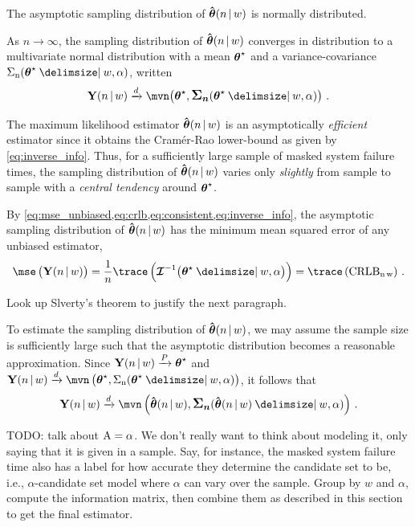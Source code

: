 \documentclass[
    11pt,
    extrafontsizes,
    article,
    oldfontcommands,
    final,
    oneside,
    openany,
    hidelinks]{memoir}
\begin{document}
The asymptotic sampling distribution of $\boldsymbol{\mathbf{\hat{\boldsymbol{\mathbf{\theta}}}}}(n {\,|\,} w)$ is normally distributed.
\begin{postulate}
\label{def:converge_in_dist}
    As $n \to \infty$, the sampling distribution of $\boldsymbol{\mathbf{\hat{\boldsymbol{\mathbf{\theta}}}}}(n {\,|\,} w)$ converges in distribution to a multivariate normal distribution with a mean ${\boldsymbol{\mathbf{\theta}}}^{\star}$ and a variance-covariance $\cov(\tparam\sysparamvec \Given w, \alpha)$, written
    \begin{equation}
    \label{eq:converge_in_dist}
        \sampd \xrightarrow{d} \mvn\!
            \left(
                \tparam\sysparamvec, \cov(\tparam\sysparamvec \Given w, \alpha)
            \right)\,.
    \end{equation}
\end{postulate}
The maximum likelihood estimator $\boldsymbol{\mathbf{\hat{\boldsymbol{\mathbf{\theta}}}}}(n {\,|\,} w)$ is an asymptotically \emph{efficient} estimator since it obtains the Cram\'{e}r-Rao lower-bound as given by \cref{eq:inverse_info}. Thus, for a sufficiently large sample of masked system failure times, the sampling distribution of $\boldsymbol{\mathbf{\hat{\boldsymbol{\mathbf{\theta}}}}}(n {\,|\,} w)$ varies only \emph{slightly} from sample to sample with a \emph{central tendency} around ${\boldsymbol{\mathbf{\theta}}}^{\star}$. 

By \cref{eq:mse_unbiased,eq:crlb,eq:consistent,eq:inverse_info}, the asymptotic sampling distribution of $\boldsymbol{\mathbf{\hat{\boldsymbol{\mathbf{\theta}}}}}(n {\,|\,} w)$ has the minimum mean squared error of any unbiased estimator,
\begin{equation}
\label{eq:mse_mle_trace}
\mse \left( \sampd \right) =
    \frac{1}{n} \trace \left (
        \infomatrx^{-1} \bigl(\tparam\sysparamvec \Given w, \alpha\bigr)
    \right) = \trace\left(\rm{CRLB}_{n\,w}\right)\,.
\end{equation}

\begin{remark}
Look up Slverty's theorem to justify the next paragraph.
\end{remark}
\sloppy
To estimate the sampling distribution of $\boldsymbol{\mathbf{\hat{\boldsymbol{\mathbf{\theta}}}}}(n {\,|\,} w)$, we may assume the sample size is sufficiently large such that the asymptotic distribution becomes a reasonable approximation. Since $\mathrm{\boldsymbol{\mathbf{Y}}}(n {\,|\,} w) \xrightarrow{P} {\boldsymbol{\mathbf{\theta}}}^{\star}$ and $\sampd \xrightarrow{d} \mvn\left(\tparam\sysparamvec, \cov(\tparam\sysparamvec \Given w, \alpha)\right)$, it follows that
\begin{equation}
\sampd \xrightarrow{d} \mvn\left(\mle, \cov(\mle \Given w, \alpha)\right)\,.
\end{equation}



TODO: talk about $\mathrm{A} = \alpha$. We don't really want to think about modeling it, only saying that it is given in a sample. Say, for instance, the masked system failure time also has a label for how accurate they determine the candidate set to be, i.e., $\alpha$-candidate set model where $\alpha$ can vary over the sample. Group by $w$ and $\alpha$, compute the information matrix, then combine them as described in this section to get the final estimator.
\end{document}
